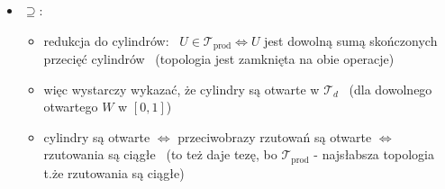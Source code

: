 \documentclass[a4paper,12pt]{article}
\begin{document}
\begin{steps}
\begin{itemize}
\begin{itemize}
            \item \(V_x \subseteq B_d(x, r) \iff \forall_{y \in V_x} \;\, d(x, y) < r\)
            \item \(d(x, y) = \displaystyle\sum_{k=1}^{\infty} 2^{-k} |x_k - y_k| = \displaystyle\sum_{k=1}^{N} 2^{-k} |x_k - y_k| + \displaystyle\sum_{k=N+1}^{\infty} 2^{-k} |x_k - y_k|\), \; gdzie
            \begin{align*}
            \sum_{k=N+1}^{\infty} 2^{-k} |x_k - y_k| \leq \sum_{k=N+1}^{\infty} 2^{-k} \overset{j \, = \, k - N - 1}{=} \sum_{j=0}^{\infty} 2^{-(N+1+j)} = 2^{-(N+1)} \sum_{j=0}^{\infty} \Big(\frac{1}{2}\Big)^j \overset{\text{geom., } q = \frac{1}{2}}{=} 2^{-(N+1)} \cdot \frac{1}{1 - \frac{1}{2}} = 2^{-N} \xrightarrow{N \to \infty} 0
            \end{align*}
            \item dobieramy \(N\) tak, żeby \(2^{-N} < \frac{r}{2} \overset{\log_2 \nearrow \text{ na } (0, \infty)}{\iff} \log_2 2^{-N} < \log_2 \frac{r}{2} \iff -N < \log_2 r - 1 \iff N > 1 - \log_2 r\)
            \item więc ustalmy \(N = \max\{1, \lfloor 1 - \log_2 r \rfloor + 1\}\)
            \item chcemy otrzymać \(\displaystyle\sum_{k=1}^{N} 2^{-k} |x_k - y_k| < \frac{r}{2}\)
            \item niech \(V_x\) będzie przecięciem cylindrów ograniczających współrzędne \(1, \dots, N\) przez \(|x_k - y_k| < \frac{r}{2}\)
            \item wtedy mamy \(\displaystyle\sum_{k=1}^{N} 2^{-k} |x_k - y_k| < \frac{r}{2} \displaystyle\sum_{k=1}^{N} 2^{-k} < \frac{r}{2} \cdot 1 = \frac{r}{2}\)
            \item czyli \(d(x, y) = \displaystyle\sum_{k=1}^{\infty} 2^{-k} |x_k - y_k| < \frac{r}{2} + \frac{r}{2} = r\) \, \(\blacksquare\)
        \end{itemize}
        \item \(\supseteq\):
        \begin{itemize}
            \item redukcja do cylindrów: \, \(U \in \mathcal{T}_{\text{prod}} \iff U\) jest dowolną sumą skończonych przecięć cylindrów \, (topologia jest zamknięta na obie operacje)
            \item więc wystarczy wykazać, że cylindry są otwarte w \(\mathcal{T}_d\) \, (dla dowolnego otwartego \(W\) w \([0, 1]\))
            \item cylindry są otwarte \(\iff\) przeciwobrazy rzutowań są otwarte \(\iff\) rzutowania są ciągłe \, (to też daje tezę, bo \(\mathcal{T}_{\text{prod}}\) - najsłabsza topologia t.że rzutowania są ciągłe)

\end{itemize}
\end{itemize}
\end{steps}
\end{document}
